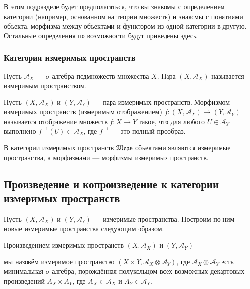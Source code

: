 \documentclass[12pt]{article}
\numberwithin{theorem}{section}
\theoremstyle{definition}
\newcommand{\defin}[2]{\hypertarget{#2}{{\color{red} #1}}}
\newcommand{\calA}{\mathcal{A}}
\newcommand{\Meas}{\mathfrak{Meas}}
\begin{document}
	В этом подразделе будет предполагаться, что вы знакомы с определением категории 
	(например, основанном на теории множеств) и знакомы с понятиями объекта, морфизма между объектами и функтором из одной категории в другую. Остальные определения по возможности будут приведены здесь.
	
	\subsubsection{Категория измеримых пространств}
	
	Пусть $ \calA_X $ --- $ \sigma $-алгебра подмножеств множества $ X $.
	Пара $ (X, \calA_X) $ называется \defin{измеримым пространством}{measurable-space}.
	
	Пусть $ (X, \calA_X) $ и $ (Y, \calA_Y) $ --- пара измеримых пространств.
	\defin{Морфизмом измеримых пространств (измеримым отображением)}{morphism-of-measurable-spaces} 
	$ f \colon (X, \calA_X) \to (Y, \calA_Y) $ называется отображение
	множеств $ f \colon X \to Y $ такое, что для любого $ U \in \calA_Y $ выполнено $ f^{-1}(U) \in \calA_X $,
	где $ f^{-1} $ --- это полный прообраз.
	
	В категории измеримых пространств $ \Meas $ объектами являются измеримые пространства, а морфизмами
	--- морфизмы измеримых пространств.
	
	\subsection{Произведение и копроизведение к категории измеримых пространств}
	
	Пусть $ (X, \calA_X) $ и $ (Y, \calA_Y) $ --- измеримые пространства.
	Построим по ним новые измеримые пространства следующим образом.
	
	\defin{Произведением измеримых пространств $ (X, \calA_X) $ и $ (Y, \calA_Y) $}{product-of-measurable-spaces}
	мы назовём измеримое пространство $ (X \times Y, \calA_X \otimes \calA_Y) $,
	где $ \calA_X \otimes \calA_Y $ есть минимальная $ \sigma $-алгебра, порождённая полукольцом
	всех возможных декартовых произведений $ A_X \times A_Y $,
	где $ A_X \in \calA_X $ и $ A_Y \in \calA_Y $.
	
\end{document}
